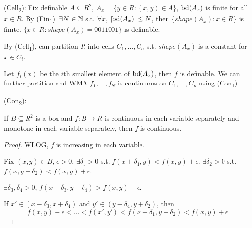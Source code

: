 \documentclass[11pt]{article}
\begin{document}
(Cell\textsubscript{2}): Fix definable \(A\subseteq R^2\), \(A_x=\{y\in R:(x,y)\in A\}\), \(\operatorname{bd}(A_x)\) is finite
for all \(x\in R\). By (Fin\textsubscript{1}), \(\exists N\in\mathbb{N}\) s.t. \(\forall x\), \(\abs{\tbd(A_x)}\le N\),
then \(\{shape(A_x):x\in R\}\) is finite.
\(\{x\in R:shape(A_x)=0011001\}\) is definable.

By (Cell\textsubscript{1}), can partition \(R\) into cells \(C_1,\dots,C_n\) s.t. \(shape(A_x)\) is a
constant for \(x\in C_i\).

Let \(f_i(x)\) be the \(i\)th smallest element of \(\operatorname{bd}(A_x)\), then \(f\) is definable. We can
further partition and WMA \(f_1,\dots,f_N\) is continuous on \(C_1,\dots,C_n\) using
(Con\textsubscript{1}).

(Con\textsubscript{2}):
\begin{lemma}[]
If \(B\subseteq R^2\) is a box and \(f:B\to R\) is continuous in each variable separately and monotone in
each variable separately, then \(f\) is continuous.
\end{lemma}

\begin{proof}
WLOG, \(f\) is increasing in each variable.

Fix \((x,y)\in B\), \(\epsilon>0\), \(\exists\delta_1>0\) s.t. \(f(x+\delta_1,y)<f(x,y)+\epsilon\). \(\exists\delta_2>0\)
s.t. \(f(x,y+\delta_2)<f(x,y)+\epsilon\).

\(\exists\delta_3,\delta_4>0\), \(f(x-\delta_3,y-\delta_4)>f(x,y)-\epsilon\).

If \(x'\in(x-\delta_3,x+\delta_4)\) and \(y'\in(y-\delta_4,y+\delta_2)\), then
\begin{equation*}
f(x,y)-\epsilon<\dots<f(x',y')<f(x+\delta_1,y+\delta_2)<f(x,y)+\epsilon
\end{equation*}
\end{proof}
\end{document}
